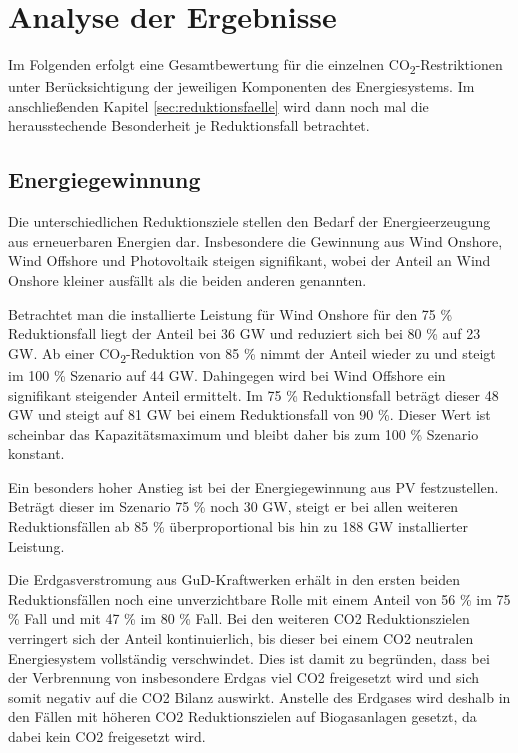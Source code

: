 \section{Analyse der Ergebnisse}
\label{sec:gesamtanalyse}
Im Folgenden erfolgt eine Gesamtbewertung für die einzelnen CO\textsubscript{2}-Restriktionen unter Berücksichtigung der jeweiligen Komponenten des Energiesystems. Im anschließenden Kapitel \ref{sec:reduktionsfaelle} wird dann noch mal die herausstechende Besonderheit je Reduktionsfall betrachtet. 

\subsection{Energiegewinnung}
Die unterschiedlichen Reduktionsziele stellen den Bedarf der Energieerzeugung aus erneuerbaren Energien dar. Insbesondere die Gewinnung aus Wind Onshore, Wind Offshore und Photovoltaik steigen signifikant, wobei der Anteil an Wind Onshore kleiner ausfällt als die beiden anderen genannten. 

Betrachtet man die installierte Leistung für Wind Onshore für den 75 \% Reduktionsfall liegt der Anteil bei 36 GW und reduziert sich bei 80 \% auf 23 GW. Ab einer CO\textsubscript{2}-Reduktion von 85 \% nimmt der Anteil wieder zu und steigt im 100 \% Szenario auf 44 GW. 
Dahingegen wird bei Wind Offshore ein signifikant steigender Anteil ermittelt. Im 75 \% Reduktionsfall beträgt dieser 48 GW und steigt auf 81 GW bei einem Reduktionsfall von 90 \%. Dieser Wert ist scheinbar das Kapazitätsmaximum und bleibt daher bis zum 100 \% Szenario konstant.

Ein besonders hoher Anstieg ist bei der Energiegewinnung aus PV festzustellen. Beträgt dieser im Szenario 75 \% noch 30 GW, steigt er bei allen weiteren Reduktionsfällen ab 85 \% überproportional bis hin zu 188 GW installierter Leistung.


Die Erdgasverstromung aus GuD-Kraftwerken erhält in den ersten beiden Reduktionsfällen noch eine unverzichtbare Rolle mit einem Anteil von 56 \% im 75 \% Fall und mit 47 \% im 80 \% Fall. Bei den weiteren CO2 Reduktionszielen verringert sich der Anteil kontinuierlich, bis dieser bei einem CO2 neutralen Energiesystem vollständig verschwindet. Dies ist damit zu begründen, dass bei der Verbrennung von insbesondere Erdgas viel CO2 freigesetzt wird und sich somit negativ auf die CO2 Bilanz auswirkt. Anstelle des Erdgases wird deshalb in den Fällen mit höheren CO2 Reduktionszielen auf Biogasanlagen gesetzt, da dabei kein CO2 freigesetzt wird. 


